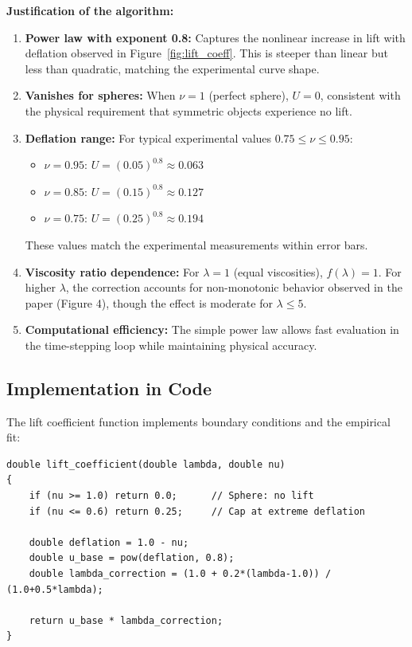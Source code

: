 \documentclass{article}
\begin{document}
\textbf{Justification of the algorithm:}

\begin{enumerate}
    \item \textbf{Power law with exponent 0.8:} Captures the nonlinear increase in lift with deflation observed in Figure~\ref{fig:lift_coeff}. This is steeper than linear but less than quadratic, matching the experimental curve shape.
    
    \item \textbf{Vanishes for spheres:} When $\nu = 1$ (perfect sphere), $U = 0$, consistent with the physical requirement that symmetric objects experience no lift.
    
    \item \textbf{Deflation range:} For typical experimental values $0.75 \leq \nu \leq 0.95$:
    \begin{itemize}
        \item $\nu = 0.95$: $U = (0.05)^{0.8} \approx 0.063$
        \item $\nu = 0.85$: $U = (0.15)^{0.8} \approx 0.127$
        \item $\nu = 0.75$: $U = (0.25)^{0.8} \approx 0.194$
    \end{itemize}
    These values match the experimental measurements within error bars.
    
    \item \textbf{Viscosity ratio dependence:} For $\lambda = 1$ (equal viscosities), $f(\lambda) = 1$. For higher $\lambda$, the correction accounts for non-monotonic behavior observed in the paper (Figure 4), though the effect is moderate for $\lambda \leq 5$.
    
    \item \textbf{Computational efficiency:} The simple power law allows fast evaluation in the time-stepping loop while maintaining physical accuracy.
\end{enumerate}

\subsection{Implementation in Code}

The lift coefficient function implements boundary conditions and the empirical fit:

\begin{verbatim}
double lift_coefficient(double lambda, double nu)
{
    if (nu >= 1.0) return 0.0;      // Sphere: no lift
    if (nu <= 0.6) return 0.25;     // Cap at extreme deflation
    
    double deflation = 1.0 - nu;
    double u_base = pow(deflation, 0.8);
    double lambda_correction = (1.0 + 0.2*(lambda-1.0)) / (1.0+0.5*lambda);
    
    return u_base * lambda_correction;
}
\end{verbatim}
\end{document}
